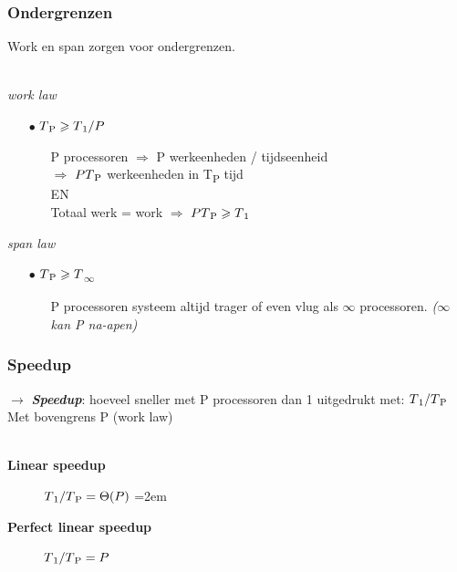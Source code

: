 \documentclass
   [kulak] %
   {kulakbeamer}
\begin{document}
\begin{frame}
	\frametitle{Ondergrenzen}
	Work en span zorgen voor ondergrenzen. \\~\\
	
	\pause
	
	\textit{work law}
	\begin{itemize}
		\item[$\bullet$] $T\textsubscript{P} \geqslant T\textsubscript{1}/P$
		\begin{itemize}
			\item[] P processoren $\Rightarrow$ P werkeenheden / tijdseenheid\\ $\Rightarrow$ $PT\textsubscript{P}$ werkeenheden in T\textsubscript{P} tijd\\EN\\ Totaal werk = work $\Rightarrow$ $PT\textsubscript{P} \geqslant T\textsubscript{1}$
		\end{itemize}
	\end{itemize}
	  
	\pause
	  
	\textit{span law}
	\begin{itemize}
		\item[$\bullet$] $T\textsubscript{P} \geqslant T$\textsubscript{$\infty$} 
		
		\begin{itemize}
			\item[] P processoren systeem altijd trager of even vlug als $\infty$ processoren. \textit{($\infty$ kan P na-apen)}
		\end{itemize}
	\end{itemize}
	
\end{frame}


\begin{frame}
	\frametitle{Speedup}
	$\rightarrow$ \textbf{\textit{Speedup}}: hoeveel sneller met P processoren dan 1 uitgedrukt met:
	$T\textsubscript{1}/T\textsubscript{P}$
	\pause
	\\
	Met bovengrens P (work law)\\~\\
	\pause
	\begin{description}
		\item[\textbf{Linear speedup}]
		 $ T\textsubscript{1}/T\textsubscript{P} = \Theta(P) $
		\itemsep=2em
		\pause
		\item[\textbf{Perfect linear speedup}] $ T\textsubscript{1}/T\textsubscript{P} = P $
	\end{description} 
	
\end{frame}
\end{document}
